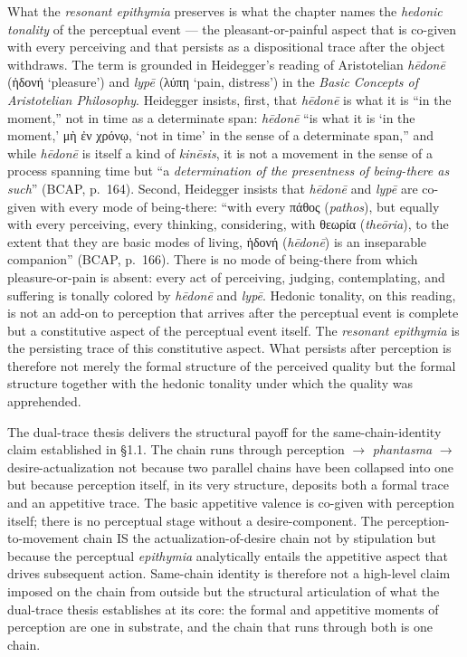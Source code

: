 \documentclass{article}
\newcommand{\gk}[1]{{\greekfont #1}}
\begin{document}
What the \textit{resonant epithymia} preserves is what the chapter names the \textit{hedonic tonality} of the perceptual event --- the pleasant-or-painful aspect that is co-given with every perceiving and that persists as a dispositional trace after the object withdraws. The term is grounded in Heidegger's reading of Aristotelian \textit{hēdonē} (\gk{ἡδονή} `pleasure') and \textit{lypē} (\gk{λύπη} `pain, distress') in the \textit{Basic Concepts of Aristotelian Philosophy}. Heidegger insists, first, that \textit{hēdonē} is what it is ``in the moment,'' not in time as a determinate span: \textit{hēdonē} ``is what it is `in the moment,' \gk{μὴ ἐν χρόνῳ}, `not in time' in the sense of a determinate span,'' and while \textit{hēdonē} is itself a kind of \textit{kinēsis}, it is not a movement in the sense of a process spanning time but ``a \textit{determination of the presentness of being-there as such}'' (BCAP, p.~164). Second, Heidegger insists that \textit{hēdonē} and \textit{lypē} are co-given with every mode of being-there: ``with every \gk{πάθος} (\textit{pathos}), but equally with every perceiving, every thinking, considering, with \gk{θεωρία} (\textit{theōria}), to the extent that they are basic modes of living, \gk{ἡδονή} (\textit{hēdonē}) is an inseparable companion'' (BCAP, p.~166). There is no mode of being-there from which pleasure-or-pain is absent: every act of perceiving, judging, contemplating, and suffering is tonally colored by \textit{hēdonē} and \textit{lypē}. Hedonic tonality, on this reading, is not an add-on to perception that arrives after the perceptual event is complete but a constitutive aspect of the perceptual event itself. The \textit{resonant epithymia} is the persisting trace of this constitutive aspect. What persists after perception is therefore not merely the formal structure of the perceived quality but the formal structure together with the hedonic tonality under which the quality was apprehended.

The dual-trace thesis delivers the structural payoff for the same-chain-identity claim established in §1.1. The chain runs through perception $\rightarrow$ \textit{phantasma} $\rightarrow$ desire-actualization not because two parallel chains have been collapsed into one but because perception itself, in its very structure, deposits both a formal trace and an appetitive trace. The basic appetitive valence is co-given with perception itself; there is no perceptual stage without a desire-component. The perception-to-movement chain IS the actualization-of-desire chain not by stipulation but because the perceptual \textit{epithymia} analytically entails the appetitive aspect that drives subsequent action. Same-chain identity is therefore not a high-level claim imposed on the chain from outside but the structural articulation of what the dual-trace thesis establishes at its core: the formal and appetitive moments of perception are one in substrate, and the chain that runs through both is one chain.
\end{document}
